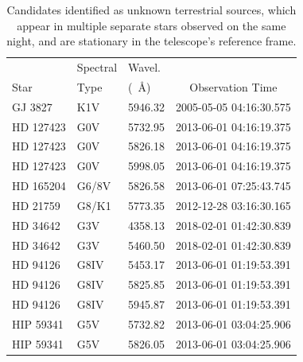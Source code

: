 \documentclass[twocolumn]{aastex701}
\begin{document}
\begin{table}
\centering
\begin{tabular}{|l|l|l|c|}
\hline
     & Spectral & Wavel. & \\
Star &  Type & (~\AA) & Observation Time \\
\hline
GJ 3827   & K1V   & 5946.32 & 2005-05-05 04:16:30.575\\
HD 127423 & G0V   & 5732.95 & 2013-06-01 04:16:19.375\\
HD 127423 & G0V   & 5826.18 & 2013-06-01 04:16:19.375\\
HD 127423 & G0V   & 5998.05 & 2013-06-01 04:16:19.375\\
HD 165204 & G6/8V & 5826.58 & 2013-06-01 07:25:43.745\\
HD 21759  & G8/K1 & 5773.35 & 2012-12-28 03:16:30.165\\
HD 34642  & G3V   & 4358.13 & 2018-02-01 01:42:30.839\\
HD 34642  & G3V   & 5460.50 & 2018-02-01 01:42:30.839\\
HD 94126  & G8IV  & 5453.17 & 2013-06-01 01:19:53.391\\
HD 94126  & G8IV  & 5825.85 & 2013-06-01 01:19:53.391\\
HD 94126  & G8IV  & 5945.87 & 2013-06-01 01:19:53.391\\
HIP 59341 & G5V   & 5732.82 & 2013-06-01 03:04:25.906\\
HIP 59341 & G5V   & 5826.05 & 2013-06-01 03:04:25.906\\
\hline
\end{tabular}
\caption{Candidates identified as unknown terrestrial sources, which appear in multiple separate stars observed on the same night, and are stationary in the telescope's reference frame.}
\label{table:terrestrial_interference}
\end{table}
\end{document}
